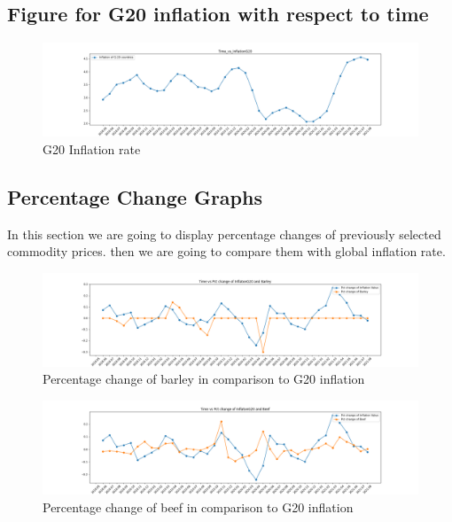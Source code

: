 \documentclass{scrartcl}
\begin{document}
\subsection{Figure for G20 inflation with respect to time}
\begin{figure} [H]
	\begin{center}
		\includegraphics[scale=0.3]{Graphics/Time_vs_InflationG20.png}
	\end{center}
	\caption{G20 Inflation rate }
	\label{fig:log-archi}
\end{figure}


\subsection{Percentage Change Graphs}
In this section we are going to display percentage changes of previously selected commodity prices. then we are going to compare them with global inflation rate.

\begin{figure} [H]
	\begin{center}
		\includegraphics[scale=0.3]{Graphics/pct_change_inflation_and_Barley.png}
	\end{center}
	\caption{Percentage change of barley in comparison to G20 inflation }
	\label{fig:log-archi}
\end{figure}

\begin{figure} [H]
	\begin{center}
		\includegraphics[scale=0.3]{Graphics/pct_change_inflation_and_Beef.png}
	\end{center}
	\caption{Percentage change of beef in comparison to G20 inflation  }
	\label{fig:log-archi}
\end{figure}
\end{document}
